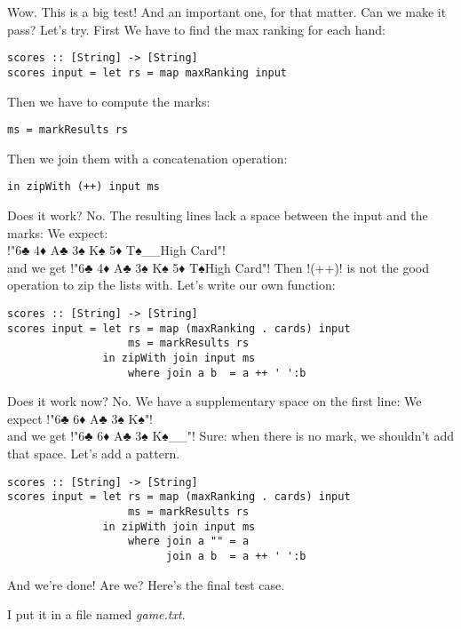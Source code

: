 \lhA Wow. This is a big test!
\lhN And an important one, for that matter. Can we make it pass?
\lhA Let's try. First We have to find the max ranking for each hand:
\begin{lstlisting}[frame=single]
scores :: [String] -> [String]
scores input = let rs = map maxRanking input
\end{lstlisting}
Then we have to compute the marks:
\begin{lstlisting}[frame=single]
                   ms = markResults rs
\end{lstlisting}
Then we join them with a concatenation operation:
\begin{lstlisting}[frame=single]
               in zipWith (++) input ms
\end{lstlisting}
\failure Does it work?
\lhN No. The resulting lines lack a space between the input and the marks:
We expect:\\ \il!"6♣ 4♦ A♣ 3♠ K♠ 5♦ T♠__High Card"! \\ 
and we get \il!"6♣ 4♦ A♣ 3♠ K♠ 5♦ T♠High Card"!
\lhA \failure Then \il!(++)! is not the good operation to zip the lists with. Let's write our own function:
\begin{lstlisting}[frame=single]
scores :: [String] -> [String]
scores input = let rs = map (maxRanking . cards) input
                   ms = markResults rs
               in zipWith join input ms
                   where join a b  = a ++ ' ':b
\end{lstlisting}
\failure Does it work now?
\lhN No. We have a supplementary space on the first line:
We expect \il!"6♣ 6♦ A♣ 3♠ K♠"! \\ and we get \il!"6♣ 6♦ A♣ 3♠ K♠__"!
\lhA \failure Sure: when there is no mark, we shouldn't add that space. Let's add a pattern.
\begin{lstlisting}[frame=single]
scores :: [String] -> [String]
scores input = let rs = map (maxRanking . cards) input
                   ms = markResults rs
               in zipWith join input ms
                   where join a "" = a
                         join a b  = a ++ ' ':b
\end{lstlisting}
\success And we're done!
\lhN Are we? Here's the final test case. 
\begin{alltt}
      
      
     
 
      
    
\end{alltt}
I put it in a file named \emph{game.txt}.
 
